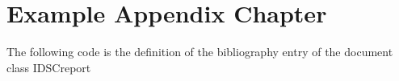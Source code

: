 
\chapter{Example Appendix Chapter}
\label{chp:ExampleAppendixChapter}

The following code is the definition of the bibliography entry of the document class IDSCreport